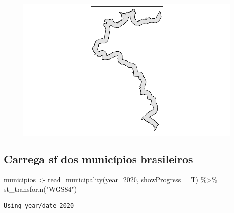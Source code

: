 \documentclass[
  letterpaper,
  DIV=11,
  numbers=noendperiod]{scrartcl}
\newenvironment{Shaded}{\begin{snugshade}}{\end{snugshade}}
\newcommand{\AttributeTok}[1]{\textcolor[rgb]{0.40,0.45,0.13}{#1}}
\newcommand{\DecValTok}[1]{\textcolor[rgb]{0.68,0.00,0.00}{#1}}
\newcommand{\FunctionTok}[1]{\textcolor[rgb]{0.28,0.35,0.67}{#1}}
\newcommand{\NormalTok}[1]{\textcolor[rgb]{0.00,0.23,0.31}{#1}}
\newcommand{\OtherTok}[1]{\textcolor[rgb]{0.00,0.23,0.31}{#1}}
\newcommand{\SpecialCharTok}[1]{\textcolor[rgb]{0.37,0.37,0.37}{#1}}
\newcommand{\StringTok}[1]{\textcolor[rgb]{0.13,0.47,0.30}{#1}}
\begin{document}
\begin{figure}[H]

{\centering \includegraphics{maps_files/figure-pdf/sflinha-1.pdf}

}

\end{figure}

\hypertarget{carrega-sf-dos-municuxedpios-brasileiros}{%
\subsection{Carrega sf dos municípios
brasileiros}\label{carrega-sf-dos-municuxedpios-brasileiros}}

\begin{Shaded}
\begin{Highlighting}[]
\NormalTok{municipios }\OtherTok{\textless{}{-}} \FunctionTok{read\_municipality}\NormalTok{(}\AttributeTok{year=}\DecValTok{2020}\NormalTok{, }\AttributeTok{showProgress =}\NormalTok{ T) }\SpecialCharTok{\%\textgreater{}\%}
  \FunctionTok{st\_transform}\NormalTok{(}\StringTok{"WGS84"}\NormalTok{)}
\end{Highlighting}
\end{Shaded}

\begin{verbatim}
Using year/date 2020
\end{verbatim}
\end{document}
